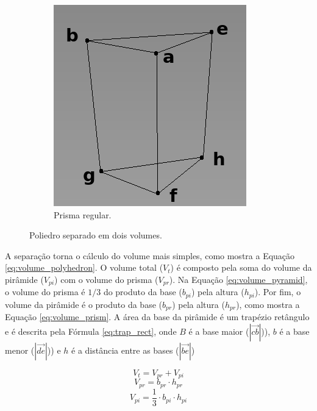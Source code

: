 \begin{figure}[H]
\begin{subfigure}[t]{0.3\textwidth}
        \includegraphics[width=\textwidth]{dados/figuras/prism_line2.png}
        \caption{Prisma regular.}
        \label{fig:prism_i}
    \end{subfigure}
    \caption{Poliedro separado em dois volumes.}
\end{figure}

A separação torna o cálculo do volume mais simples, como mostra a Equação \ref{eq:volume_polyhedron}. 
O volume total ($V_t$) é composto pela soma do volume da pirâmide ($V_{pi}$) com o volume do prisma ($V_{pr}$).
Na Equação \ref{eq:volume_pyramid}, o volume do prisma é $1/3$ do produto da base ($b_{pi}$) pela altura ($h_{pi}$). 
Por fim, o volume da pirâmide é o produto da base ($b_{pr}$) pela altura  ($h_{pr}$), como mostra a Equação \ref{eq:volume_prism}.
A área da base da pirâmide é um trapézio retângulo e é descrita pela Fórmula \ref{eq:trap_rect}, onde $B$ é a base maior ($\left | \overrightarrow{cb} \right |$)), $b$ é a base menor ($\left | \overrightarrow{de} \right |$)) e $h$ é a distância entre as bases ($\left | \overrightarrow{be} \right |$)


\begin{multicols}{3}
    \begin{equation}
        \label{eq:volume_polyhedron}
        V_t = V_{pr} + V_{pi}
    \end{equation}
    \begin{equation}
        \label{eq:volume_pyramid}
        V_{pr} = b_{pr} \cdot h_{pr}
    \end{equation}
    \begin{equation}
        \label{eq:volume_prism}
        V_{pi} = \frac{1}{3} \cdot b_{pi} \cdot h_{pi}
    \end{equation}
\end{multicols}

